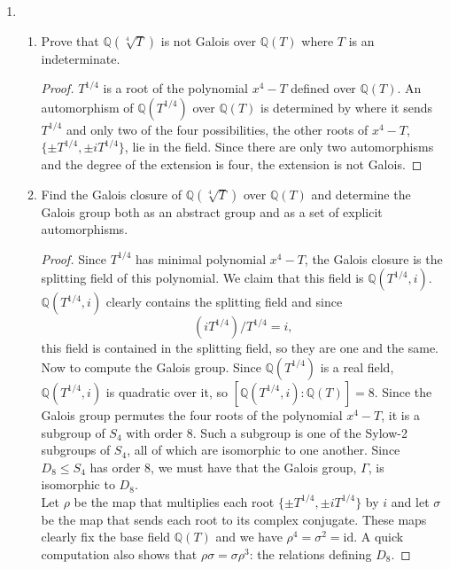 \documentclass[11pt,letterpaper]{report}
\newcommand{\rationals}{\mathbb{Q}}
\begin{document}
\begin{enumerate}
	\item \begin{enumerate}
		\item Prove that $\rationals(\sqrt[4]{T})$ is not Galois over $\rationals(T)$ where $T$ is an indeterminate.
		\begin{proof}
			$T^{1/4}$ is a root of the polynomial $x^4-T$ defined over $\rationals(T)$. An automorphism of $\rationals(T^{1/4})$ over $\rationals(T)$ is determined by where it sends $T^{1/4}$ and only two of the four possibilities, the other roots of $x^4-T$, $\{\pm T^{1/4}, \pm iT^{1/4}\}$, lie in the field. Since there are only two automorphisms and the degree of the extension is four, the extension is not Galois.
		\end{proof}
		\item Find the Galois closure of $\rationals(\sqrt[4]{T})$ over $\rationals(T)$ and determine the Galois group both as an abstract group and as a set of explicit automorphisms.
		\begin{proof}
			Since $T^{1/4}$ has minimal polynomial $x^4-T$, the Galois closure is the splitting field of this polynomial. We claim that this field is $\rationals(T^{1/4}, i)$. $\rationals(T^{1/4}, i)$ clearly contains the splitting field and since
			\[
			(iT^{1/4})/T^{1/4} = i,
			\]
			this field is contained in the splitting field, so they are one and the same.\\

			\noindent Now to compute the Galois group. Since $\rationals(T^{1/4})$ is a real field, $\rationals(T^{1/4}, i)$ is quadratic over it, so $[\rationals(T^{1/4}, i): \rationals(T)] = 8$. Since the Galois group permutes the four roots of the polynomial $x^4-T$, it is a subgroup of $S_4$ with order 8. Such a subgroup is one of the Sylow-2 subgroups of $S_4$, all of which are isomorphic to one another. Since $D_8 \leq S_4$ has order 8, we must have that the Galois group, $\Gamma$, is isomorphic to $D_8$.\\

			\noindent Let $\rho$ be the map that multiplies each root $\{\pm T^{1/4}, \pm iT^{1/4}\}$ by $i$ and let $\sigma$ be the map that sends each root to its complex conjugate. These maps clearly fix the base field $\rationals(T)$ and we have $\rho^4 = \sigma^2 = \text{id}$. A quick computation also shows that $\rho\sigma = \sigma\rho^3$: the relations defining $D_8$.
		\end{proof}
	\end{enumerate}


\end{enumerate}
\end{document}
